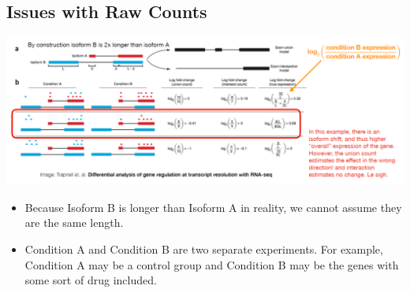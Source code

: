 \documentclass[10pt]{article}
\begin{document}
\subsection*{Issues with Raw Counts}
\begin{center}
    \includegraphics*[scale=0.45]{W5_4.png}
\end{center}
\begin{itemize}
    \item Because Isoform B is longer than Isoform A in reality, we cannot assume they are the same length.
    \item Condition A and Condition B are two separate experiments. For example, Condition A may be a control group and Condition B may be the genes with some sort of drug included.
\end{itemize}
\end{document}
